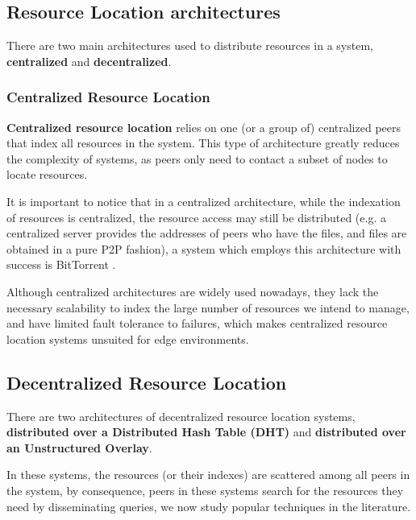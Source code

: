\subsection{Resource Location architectures}

There are two main architectures used to distribute resources in a system, \textbf{centralized} and \textbf{decentralized}. 

\subsubsection{Centralized Resource Location}

\textbf{Centralized resource location} relies on one (or a group of) centralized peers that index all resources in the system. This type of architecture greatly reduces the complexity of systems, as peers only need to contact a subset of nodes to locate resources. 

It is important to notice that in a centralized architecture, while the indexation of resources is centralized, the resource access may still be distributed (e.g. a centralized server provides the addresses of peers who have the files, and files are obtained in a pure P2P fashion), a system which employs this architecture with success is BitTorrent \cite{cohen2003incentives}.

Although centralized architectures are widely used nowadays, they lack the necessary scalability to index the large number of resources we intend to manage, and have limited fault tolerance to failures, which makes centralized resource location systems unsuited for edge environments. 


\subsection{Decentralized Resource Location}

There are two architectures of decentralized resource location systems, \textbf{distributed over a Distributed Hash Table (DHT)} and \textbf{distributed over an Unstructured Overlay}. 

In these systems, the resources (or their indexes) are scattered among all peers in the system, by consequence, peers in these systems search for the resources they need by disseminating queries, we now study popular techniques in the literature.

